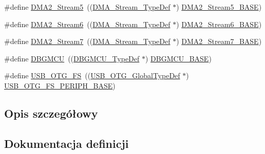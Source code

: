\begin{DoxyCompactItemize}
\item 
\#define \hyperlink{group___peripheral__declaration_gac40f58718761251875b5a897287efd83}{D\+M\+A2\+\_\+\+Stream5}~((\hyperlink{struct_d_m_a___stream___type_def}{D\+M\+A\+\_\+\+Stream\+\_\+\+Type\+Def} $\ast$) \hyperlink{group___peripheral__memory__map_gaed1460fdc407b6decfbffccb0260d0af}{D\+M\+A2\+\_\+\+Stream5\+\_\+\+B\+A\+SE})
\item 
\#define \hyperlink{group___peripheral__declaration_ga11a00b283e0911cd427e277e5a314ccc}{D\+M\+A2\+\_\+\+Stream6}~((\hyperlink{struct_d_m_a___stream___type_def}{D\+M\+A\+\_\+\+Stream\+\_\+\+Type\+Def} $\ast$) \hyperlink{group___peripheral__memory__map_ga5e81174c96fd204fa7c82c815e85c8e6}{D\+M\+A2\+\_\+\+Stream6\+\_\+\+B\+A\+SE})
\item 
\#define \hyperlink{group___peripheral__declaration_gacc135dbca0eca67d5aa0abc555f053ce}{D\+M\+A2\+\_\+\+Stream7}~((\hyperlink{struct_d_m_a___stream___type_def}{D\+M\+A\+\_\+\+Stream\+\_\+\+Type\+Def} $\ast$) \hyperlink{group___peripheral__memory__map_gaa9faa708ad2440d24eb1064cba9bb06d}{D\+M\+A2\+\_\+\+Stream7\+\_\+\+B\+A\+SE})
\item 
\#define \hyperlink{group___peripheral__declaration_ga92ec6d9ec2251fda7d4ce09748cd74b4}{D\+B\+G\+M\+CU}~((\hyperlink{struct_d_b_g_m_c_u___type_def}{D\+B\+G\+M\+C\+U\+\_\+\+Type\+Def} $\ast$) \hyperlink{group___peripheral__memory__map_ga4adaf4fd82ccc3a538f1f27a70cdbbef}{D\+B\+G\+M\+C\+U\+\_\+\+B\+A\+SE})
\item 
\#define \hyperlink{group___peripheral__declaration_ga9ebb053ee138fb47cdfede0e3371123d}{U\+S\+B\+\_\+\+O\+T\+G\+\_\+\+FS}~((\hyperlink{struct_u_s_b___o_t_g___global_type_def}{U\+S\+B\+\_\+\+O\+T\+G\+\_\+\+Global\+Type\+Def} $\ast$) \hyperlink{group___peripheral__memory__map_gaa86d4c80849a74938924e73937b904e7}{U\+S\+B\+\_\+\+O\+T\+G\+\_\+\+F\+S\+\_\+\+P\+E\+R\+I\+P\+H\+\_\+\+B\+A\+SE})
\end{DoxyCompactItemize}


\subsection{Opis szczegółowy}


\subsection{Dokumentacja definicji}
\mbox{\label{group___peripheral__declaration_ga54d148b91f3d356713f7e367a2243bea}} 
